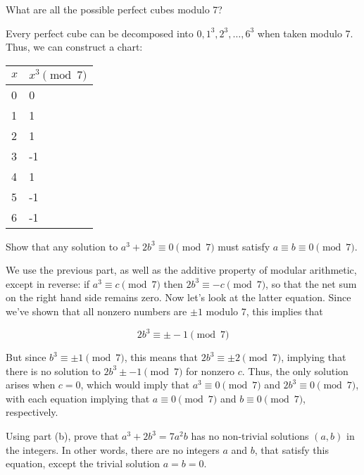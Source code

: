 \documentclass[11pt]{article}
\begin{document}
\begin{Parts}

\Part What are all the possible perfect cubes modulo 7?

\begin{solution}
  Every perfect cube can be decomposed into $0, 1^3, 2^3, \dots, 6^3$ when taken modulo 7. Thus, we can construct a chart: 

  \begin{center}
    \begin{tabular}{l|l}
      $x$ & $x^3 \pmod{7}$ \\ \hline
      0   & 0              \\
      1   & 1              \\
      2   & 1              \\
      3   & -1             \\
      4   & 1              \\
      5   & -1             \\
      6   & -1            
      \end{tabular}
  \end{center}


\end{solution}
\Part Show that any solution to $a^3 + 2b^3 \equiv 0 \pmod{7}$ must satisfy $a \equiv b \equiv 0 \pmod{7}$.


\begin{solution}
  We use the previous part, as well as the additive property of modular arithmetic, except in reverse: if $a^3 \equiv c \pmod 7$ then $2b^3 \equiv -c \pmod 7$, so that the net sum on the right hand side remains zero. Now let's look at the latter equation. Since we've shown that all nonzero numbers are $\pm 1$ modulo 7, this implies that

  \[ 2b^3 \equiv \pm -1 \pmod 7\] 

  But since $b^3 \equiv \pm 1 \pmod 7$, this means that $2b^3 \equiv \pm 2 \pmod 7$, implying that there is no solution to $2b^3 \pm -1 \pmod 7$ for nonzero $c$. Thus, the only solution arises when $c = 0$, which would imply that $a^3 \equiv 0 \pmod 7$ and $2b^3 \equiv 0 \pmod 7$, with each equation implying that $a \equiv 0 \pmod 7$ and $b \equiv 0 \pmod 7$, respectively.
\end{solution}

\Part Using part (b), prove that $a^3 + 2b^3 = 7a^2b$ has no non-trivial solutions $(a, b)$ in the integers. In other words, there are no integers $a$ and $b$, that satisfy this equation, except the trivial solution $a=b=0$.


\end{Parts}
\end{document}
